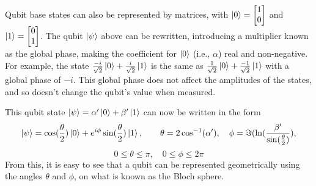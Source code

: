 \documentclass[a4paper,11pt, titlepage, twoside]{article}
\begin{document}
Qubit base states can also be represented by matrices, with $\ket{0} = 
\begin{bmatrix}
	1 \\ 0
\end{bmatrix}$
and $\ket{1} = 
\begin{bmatrix}
	0 \\ 1
\end{bmatrix}$.
The qubit $\ket{\psi}$ above can be rewritten, introducing a multiplier known as the global phase, making the coefficient for $\ket{0}$ (i.e., $\alpha$) real and non-negative. For example, the state $\frac{-i}{\sqrt{2}}\ket{0} + \frac{i}{\sqrt{2}}\ket{1}$ is the same as  $\frac{1}{\sqrt{2}}\ket{0} + \frac{-1}{\sqrt{2}}\ket{1}$ with a global phase of $-i$. This global phase does not affect the amplitudes of the states, and so doesn't change the qubit's value when measured.\par
This qubit state $\ket{\psi}=\alpha'\ket{0} + \beta'\ket{1}$  can now be written in the form
$$\ket{\psi} = \cos(\frac{\theta}{2})\ket{0} + e^{i\phi}\sin(\frac{\theta}{2})\ket{1},\qquad \theta = 2\cos^{-1}(\alpha'), \quad \phi = \Im(\ln(\frac{\beta'}{\sin(\frac{\theta}{2})}),$$
$$0 \leq \theta \leq \pi,\quad 0 \leq \phi \leq 2\pi$$
From this, it is easy to see that a qubit can be represented geometrically using the angles $\theta$ and $\phi$, on what is known as the Bloch sphere.
\end{document}
